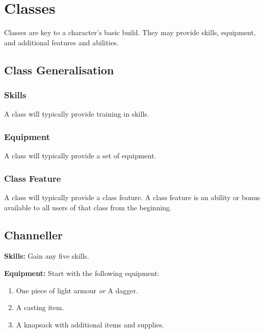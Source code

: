 \documentclass[]{article}
\date{}
\providecommand{\tightlist}{%
  \setlength{\itemsep}{0pt}\setlength{\parskip}{0pt}}
\begin{document}
\section{Classes}\label{classes}

Classes are key to a character's basic build. They may provide skills,
equipment, and additional features and abilities.

\subsection{Class Generalisation}\label{class-generalisation}

\subsubsection{Skills}\label{skills}

A class will typically provide training in skills.

\subsubsection{Equipment}\label{equipment}

A class will typically provide a set of equipment.

\subsubsection{Class Feature}\label{class-feature}

A class will typically provide a class feature. A class feature is an
ability or bonus available to all users of that class from the
beginning.

\subsection{Channeller}\label{channeller}

\textbf{Skills:} Gain any five skills.

\textbf{Equipment:} Start with the following equipment:

\begin{enumerate}
\def\labelenumi{\arabic{enumi}.}
\tightlist
\item
  One piece of light armour \emph{or} A dagger.
\item
  A casting item.
\item
  A knapsack with additional items and supplies.
\end{enumerate}
\end{document}
